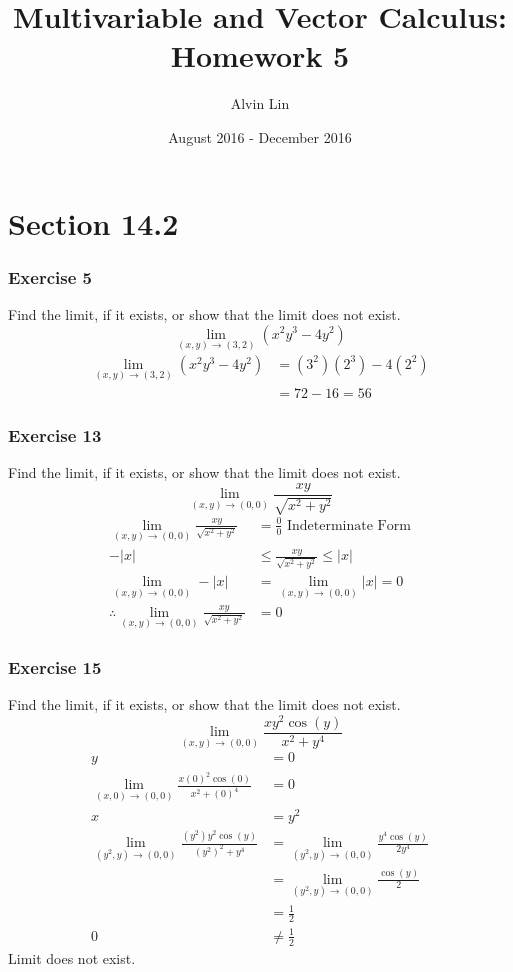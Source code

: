 \documentclass[letterpaper, 12pt]{math}
\title{Multivariable and Vector Calculus: Homework 5}
\author{Alvin Lin}
\date{August 2016 - December 2016}
\begin{document}
\maketitle

\section*{Section 14.2}

\subsubsection*{Exercise 5}
Find the limit, if it exists, or show that the limit does not exist.
\[ \lim_{(x,y)\to(3,2)}(x^2y^3-4y^2) \]
\begin{align*}
  \lim_{(x,y)\to(3,2)}(x^2y^3-4y^2) &= (3^2)(2^3)-4(2^2) \\
  &= 72-16 = 56
\end{align*}

\subsubsection*{Exercise 13}
Find the limit, if it exists, or show that the limit does not exist.
\[ \lim_{(x,y)\to(0,0)}\frac{xy}{\sqrt{x^2+y^2}} \]
\begin{align*}
  \lim_{(x,y)\to(0,0)}\frac{xy}{\sqrt{x^2+y^2}} &= \frac{0}{0}
    \text{ Indeterminate Form} \\
  -|x| &\le \frac{xy}{\sqrt{x^2+y^2}} \le |x| \\
  \lim_{(x,y)\to(0,0)}-|x| &= \lim_{(x,y)\to(0,0)}|x| = 0 \\
  \therefore \lim_{(x,y)\to(0,0)}\frac{xy}{\sqrt{x^2+y^2}} &= 0
\end{align*}

\subsubsection*{Exercise 15}
Find the limit, if it exists, or show that the limit does not exist.
\[ \lim_{(x,y)\to(0,0)}\frac{xy^2\cos(y)}{x^2+y^4} \]
\begin{align*}
  y &= 0 \\
  \lim_{(x,0)\to(0,0)}\frac{x(0)^2\cos(0)}{x^2+(0)^4} &= 0 \\
  x &= y^2 \\
  \lim_{(y^2,y)\to(0,0)}\frac{(y^2)y^2\cos(y)}{(y^2)^2+y^4} &=
    \lim_{(y^2,y)\to(0,0)}\frac{y^4\cos(y)}{2y^4} \\
  &= \lim_{(y^2,y)\to(0,0)}\frac{\cos(y)}{2} \\
  &= \frac{1}{2} \\
  0 &\ne \frac{1}{2}
\end{align*}
Limit does not exist.
\end{document}
